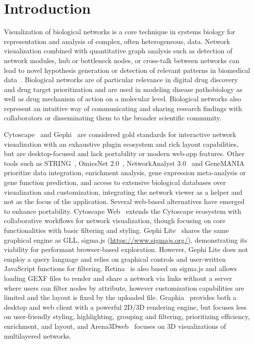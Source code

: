 \section{Introduction}
Visualization of biological networks is a core technique in systems biology for representation and analysis of complex, often heterogeneous, data. Network visualization combined with quantitative graph analysis such as detection of network modules, hub or bottleneck nodes, or cross-talk between networks can lead to novel hypothesis generation or detection of relevant patterns in biomedical data~\citep{ehlersIntroductionSurveyBiological2025}. Biological networks are of particular relevance in digital drug discovery and drug target prioritization and are used in modeling disease pathobiology as well as drug mechanism of action on a molecular level. Biological networks also represent an intuitive way of communicating and sharing research findings with collaborators or disseminating them to the broader scientific community.

Cytoscape~\citep{shannonCytoscapeSoftwareEnvironment2003} and Gephi~\citep{bastianGephiOpenSource2009} are considered gold standards for interactive network visualization with an exhaustive plugin ecosystem and rich layout capabilities, but are desktop-focused and lack portability or modern web-app features. Other tools such as STRING~\citep{szklarczykSTRINGDatabase20252025}, OmicsNet 2.0~\citep{zhouOmicsNet20Webbased2022}, NetworkAnalyst 3.0~\citep{zhouNetworkAnalyst30Visual2019} and GeneMANIA~\citep{franzGeneMANIAUpdate20182018} prioritize data integration, enrichment analysis, gene expression meta-analysis or gene function prediction, and access to extensive biological databases over visualization and customization, integrating the network viewer as a helper and not as the focus of the application. Several web-based alternatives have emerged to enhance portability. Cytoscape Web~\citep{onoCytoscapeWebBringing2025} extends the Cytoscape ecosystem with collaborative workflows for network visualization, though focusing on core functionalities with basic filtering and styling. Gephi Lite~\citep{jacomyGephiGephilite2025} shares the same graphical engine as GLL, sigma.js (\url{https://www.sigmajs.org/}), demonstrating its viability for performant browser-based exploration. However, Gephi Lite does not employ a query language and relies on graphical controls and user-written JavaScript functions for filtering. Retina~\citep{ouestwareRetina} is also based on sigma.js and allows loading GEXF files to render and share a network via links without a server where users can filter nodes by attribute, however customization capabilities are limited and the layout is fixed by the uploaded file. Graphia~\citep{freemanGraphiaPlatformGraphbased2022} provides both a desktop and web client with a powerful 2D/3D rendering engine, but focuses less on user-friendly styling, highlighting, grouping and filtering, prioritizing efficiency, enrichment, and layout, and Arena3Dweb~\citep{karatzasArena3DwebInteractive3D2021} focuses on 3D visualizations of multilayered networks.


